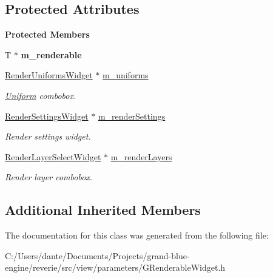 \subsection*{Protected Attributes}
\begin{Indent}\textbf{ Protected Members}\par
\begin{DoxyCompactItemize}
\item 
\mbox{\label{classrev_1_1_view_1_1_renderable_widget_a34f26a3aeff8e043601613212dff4d56}} 
T $\ast$ {\bfseries m\+\_\+renderable}
\item 
\mbox{\label{classrev_1_1_view_1_1_renderable_widget_a8a7c9bfe54e30c5a1a3ac313fc1087b0}} 
\mbox{\hyperlink{classrev_1_1_view_1_1_render_uniforms_widget}{Render\+Uniforms\+Widget}} $\ast$ \mbox{\hyperlink{classrev_1_1_view_1_1_renderable_widget_a8a7c9bfe54e30c5a1a3ac313fc1087b0}{m\+\_\+uniforms}}
\begin{DoxyCompactList}\small\item\em \mbox{\hyperlink{structrev_1_1_uniform}{Uniform}} combobox. \end{DoxyCompactList}\item 
\mbox{\label{classrev_1_1_view_1_1_renderable_widget_ac4e8291531d6696b4c9f53c027850479}} 
\mbox{\hyperlink{classrev_1_1_view_1_1_render_settings_widget}{Render\+Settings\+Widget}} $\ast$ \mbox{\hyperlink{classrev_1_1_view_1_1_renderable_widget_ac4e8291531d6696b4c9f53c027850479}{m\+\_\+render\+Settings}}
\begin{DoxyCompactList}\small\item\em Render settings widget. \end{DoxyCompactList}\item 
\mbox{\label{classrev_1_1_view_1_1_renderable_widget_aaaa76d86b59b6d316c344f3f6eef0417}} 
\mbox{\hyperlink{classrev_1_1_view_1_1_render_layer_select_widget}{Render\+Layer\+Select\+Widget}} $\ast$ \mbox{\hyperlink{classrev_1_1_view_1_1_renderable_widget_aaaa76d86b59b6d316c344f3f6eef0417}{m\+\_\+render\+Layers}}
\begin{DoxyCompactList}\small\item\em Render layer combobox. \end{DoxyCompactList}\end{DoxyCompactItemize}
\end{Indent}
\subsection*{Additional Inherited Members}


The documentation for this class was generated from the following file\+:\begin{DoxyCompactItemize}
\item 
C\+:/\+Users/dante/\+Documents/\+Projects/grand-\/blue-\/engine/reverie/src/view/parameters/G\+Renderable\+Widget.\+h\end{DoxyCompactItemize}
